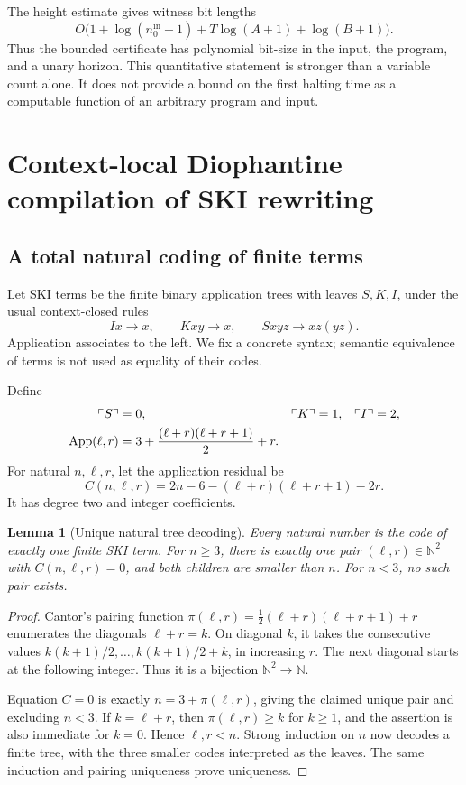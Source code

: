 \documentclass[11pt,a4paper]{article}
\newtheorem{lemma}[lemma]{Lemma}
\theoremstyle{definition}
\theoremstyle{remark}
\newcommand{\N}{\mathbb N}
\newcommand{\App}{\operatorname{App}}
\newcommand{\srctag}[1]{\texorpdfstring{\hspace{0.5em}{\normalfont\small\color{accent}[#1]}}{ [#1]}}
\begin{document}
The height estimate gives witness bit lengths
\[
 O\bigl(1+\log(n_0^{\mathrm{in}}+1)+T\log(A+1)+\log(B+1)\bigr).
\]
Thus the bounded certificate has polynomial bit-size in the input, the program, and a unary horizon. This quantitative statement is stronger than a variable count alone. It does not provide a bound on the first halting time as a computable function of an arbitrary program and input.

\section{Context-local Diophantine compilation of SKI rewriting\srctag{04}}\label{cdc:wf:sec:ski}
\subsection{A total natural coding of finite terms}
Let SKI terms be the finite binary application trees with leaves $S,K,I$, under the usual context-closed rules
\begin{equation}\label{cdc:wf:eq:ski-rules}
 Ix\to x,\qquad Kxy\to x,\qquad Sxyz\to xz(yz).
\end{equation}
Application associates to the left. We fix a concrete syntax; semantic equivalence of terms is not used as equality of their codes.

Define
\begin{align}
 \ulcorner S\urcorner&=0,&\ulcorner K\urcorner&=1,&\ulcorner I\urcorner&=2,\notag\\
 \App(\ell,r)&=3+\frac{(\ell+r)(\ell+r+1)}2+r.\label{cdc:wf:eq:app}
\end{align}
For natural $n,\ell,r$, let the application residual be
\begin{equation}\label{cdc:wf:eq:app-residual}
 C(n,\ell,r)=2n-6-(\ell+r)(\ell+r+1)-2r.
\end{equation}
It has degree two and integer coefficients.

\begin{lemma}[Unique natural tree decoding]\label{cdc:wf:lem:treecode}
Every natural number is the code of exactly one finite SKI term. For $n\geq3$, there is exactly one pair $(\ell,r)\in\N^2$ with $C(n,\ell,r)=0$, and both children are smaller than $n$. For $n<3$, no such pair exists.
\end{lemma}
\begin{proof}
Cantor's pairing function $\pi(\ell,r)=\frac12(\ell+r)(\ell+r+1)+r$ enumerates the diagonals $\ell+r=k$. On diagonal $k$, it takes the consecutive values $k(k+1)/2,\ldots,k(k+1)/2+k$, in increasing $r$. The next diagonal starts at the following integer. Thus it is a bijection $\N^2\to\N$.

Equation $C=0$ is exactly $n=3+\pi(\ell,r)$, giving the claimed unique pair and excluding $n<3$. If $k=\ell+r$, then $\pi(\ell,r)\geq k$ for $k\geq1$, and the assertion is also immediate for $k=0$. Hence $\ell,r<n$. Strong induction on $n$ now decodes a finite tree, with the three smaller codes interpreted as the leaves. The same induction and pairing uniqueness prove uniqueness.
\end{proof}
\end{document}
